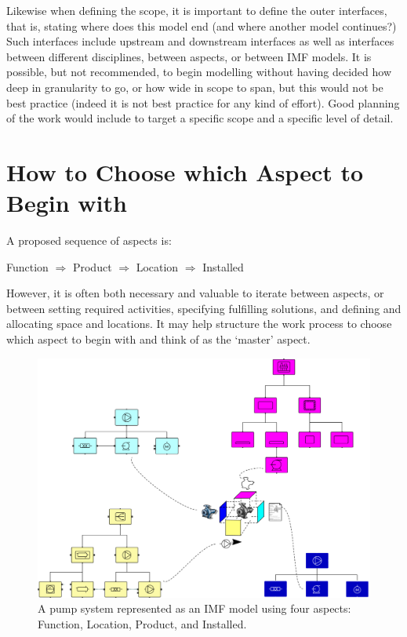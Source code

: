 \documentclass[../main.tex]{subfiles}
\begin{document}
Likewise when defining the scope, it is important to define the outer interfaces, that is, stating where does this model end
(and where another model continues?) Such interfaces include upstream and downstream interfaces as well as interfaces
between different disciplines, between aspects, or between IMF models.
It is possible, but not recommended, to begin modelling without having decided how deep in granularity to go, or how wide in scope to span, but this would not be best practice (indeed it is not best practice for any kind of effort). Good planning of the work would include to target a specific scope and a specific level of detail.

\section{How to Choose which Aspect to Begin with}
A proposed sequence of aspects is:

\begin{center}
  Function $\Rightarrow$ Product $\Rightarrow$ Location $\Rightarrow$ Installed
\end{center}

However, it is often both necessary and valuable to iterate between aspects, or between setting required activities,
specifying fulfilling solutions, and defining and allocating space and locations. It may help structure the work
process to choose which aspect to begin with and think of as the `master' aspect.

\begin{figure}[htb]
  \centering
  \includegraphics[width=.9\textwidth]{img/IMFmanual-img051.png}
  \caption[A pump system represented as an IMF model using four aspects.]{A pump system represented as an IMF model using four aspects: Function, Location, Product, and Installed.}
  \label{fig:Figure 32}
\end{figure}
\end{document}
